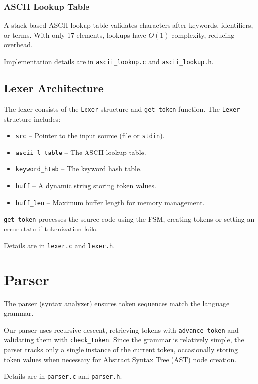 \documentclass[12pt,a4paper]{article}
\begin{document}
\subsubsection{ASCII Lookup Table}
A stack-based ASCII lookup table validates characters after keywords, identifiers, or terms. With only 17 elements, lookups have \( O(1) \) complexity, reducing overhead. 

Implementation details are in \texttt{ascii\_lookup.c} and \texttt{ascii\_lookup.h}.

\newpage

\subsection{Lexer Architecture}
The lexer consists of the \texttt{Lexer} structure and \texttt{get\_token} function. The \texttt{Lexer} structure includes:

\begin{itemize}
    \item \texttt{src} – Pointer to the input source (file or \texttt{stdin}).
    \item \texttt{ascii\_l\_table} – The ASCII lookup table.
    \item \texttt{keyword\_htab} – The keyword hash table.
    \item \texttt{buff} – A dynamic string storing token values.
    \item \texttt{buff\_len} – Maximum buffer length for memory management.
\end{itemize}

\texttt{get\_token} processes the source code using the FSM, creating tokens or setting an error state if tokenization fails.

Details are in \texttt{lexer.c} and \texttt{lexer.h}.

\section{Parser \cite{parser}}
The parser (syntax analyzer) ensures token sequences match the language grammar.

Our parser uses recursive descent, retrieving tokens with \texttt{advance\_token} and validating them with \texttt{check\_token}. Since the grammar is relatively simple, the parser tracks only a single instance of the current token, occasionally storing token values when necessary for Abstract Syntax Tree (AST) node creation.

Details are in \texttt{parser.c} and \texttt{parser.h}.
\end{document}
